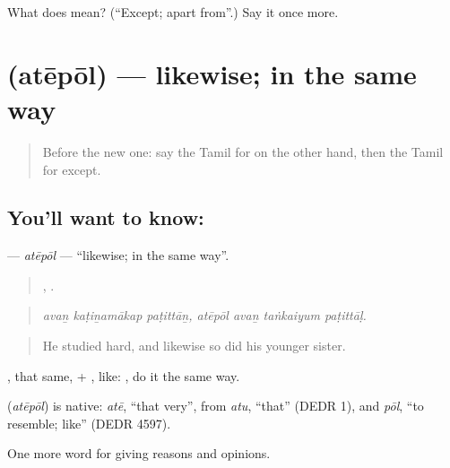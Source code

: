 \begin{tcolorbox}[breakable,colback=teal!4,colframe=teal!35!black,title={Before you move on}]
What does  mean? (\textquotedblleft{}Except; apart from\textquotedblright{}.) Say it once more.
\end{tcolorbox}
\section[\texorpdfstring{\ta{அதேபோல்} (atēpōl)}{அதேபோல் (atēpōl)}]{ (atēpōl) — likewise; in the same way}

\label{lesson:TA-C357-atepol}



\begin{quote}
Before the new one: say the Tamil for on the other hand, then the Tamil for except.
\end{quote}

\subsection*{You'll want to know: }
\textbf{} — \emph{atēpōl} — \textquotedblleft{}likewise; in the same way\textquotedblright{}.

\begin{quote}
  ,    .
\end{quote}

\begin{quote}
\emph{avaṉ kaṭiṉamākap paṭittāṉ, atēpōl avaṉ taṅkaiyum paṭittāḷ.}
\end{quote}

\begin{quote}
He studied hard, and likewise so did his younger sister.
\end{quote}

, that same, + , like:  , do it the same way.

\begin{cousinweb}
\textbf{} (\emph{atēpōl}) is native: \emph{atē}, \textquotedblleft{}that very\textquotedblright{}, from \emph{atu}, \textquotedblleft{}that\textquotedblright{} (DEDR 1), and \emph{pōl}, \textquotedblleft{}to resemble; like\textquotedblright{} (DEDR 4597).
\end{cousinweb}

\begin{grammarlens}[title={What you've built}]
One more word for giving reasons and opinions.
\end{grammarlens}

